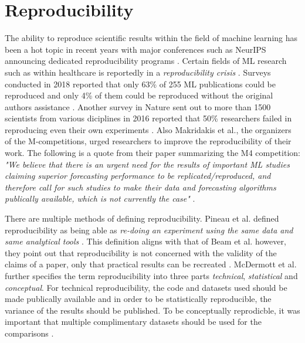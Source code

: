 \section{Reproducibility}
\label{sec:reproducibility}
The ability to reproduce scientific results within the field of machine learning has been a hot topic in recent years with major conferences such as NeurIPS announcing dedicated reproducibility programs \cite{pineau2020improving}. Certain fields of ML research such as within healthcare is reportedly in a \textit{reproducibility crisis} \cite{beam2020challenges, mcdermott2019reproducibility}. Surveys conducted in 2018 reported that only 63\% of 255 ML publications could be reproduced and only 4\% of them could be reproduced without the original authors assistance \cite{pineau2020improving}. Another survey in Nature sent out to more than 1500 scientists from various diciplines in 2016 reported that 50\% researchers failed in reproducing even their own experiments \cite{baker20161}. Also Makridakis et al., the organizers of the M-competitions, urged researchers to improve the reproducibility of their work. The following is a quote from their paper summarizing the M4 competition: \textit{"We believe that there is an urgent need for the results of important ML studies claiming superior forecasting performance to be replicated/reproduced, and therefore call for such studies to make their data and forecasting algorithms publically available, which is not currently the case"} \cite{makridakis_m4_2020}.

There are multiple methods of defining reproducibility. Pineau et al. defined reproducibility as being able as \textit{re-doing an experiment using the same data and same analytical tools} \cite{pineau2020improving}. This definition aligns with that of Beam et al. however, they point out that reproducibility is not concerned with the validity of the claims of a paper, only that practical results can be recreated \cite{beam2020challenges}. McDermott et al. further specifies the term reproducibility into three parts \textit{technical}, \textit{statistical} and \textit{conceptual}. For technical reproducibility, the code and datasets used should be made publically available and in order to be statistically reproducible, the variance of the results should be published. To be conceptually reprodicble, it was important that multiple complimentary datasets should be used for the comparisons \cite{mcdermott2019reproducibility}.

